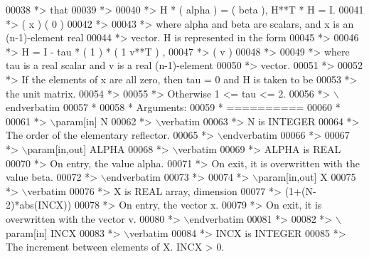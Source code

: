 \begin{DoxyCode}
00038 \textcolor{comment}{*> that}
00039 \textcolor{comment}{*>}
00040 \textcolor{comment}{*>       H * ( alpha ) = ( beta ),   H**T * H = I.}
00041 \textcolor{comment}{*>           (   x   )   (   0  )}
00042 \textcolor{comment}{*>}
00043 \textcolor{comment}{*> where alpha and beta are scalars, and x is an (n-1)-element real}
00044 \textcolor{comment}{*> vector. H is represented in the form}
00045 \textcolor{comment}{*>}
00046 \textcolor{comment}{*>       H = I - tau * ( 1 ) * ( 1 v**T ) ,}
00047 \textcolor{comment}{*>                     ( v )}
00048 \textcolor{comment}{*>}
00049 \textcolor{comment}{*> where tau is a real scalar and v is a real (n-1)-element}
00050 \textcolor{comment}{*> vector.}
00051 \textcolor{comment}{*>}
00052 \textcolor{comment}{*> If the elements of x are all zero, then tau = 0 and H is taken to be}
00053 \textcolor{comment}{*> the unit matrix.}
00054 \textcolor{comment}{*>}
00055 \textcolor{comment}{*> Otherwise  1 <= tau <= 2.}
00056 \textcolor{comment}{*> \(\backslash\)endverbatim}
00057 \textcolor{comment}{*}
00058 \textcolor{comment}{*  Arguments:}
00059 \textcolor{comment}{*  ==========}
00060 \textcolor{comment}{*}
00061 \textcolor{comment}{*> \(\backslash\)param[in] N}
00062 \textcolor{comment}{*> \(\backslash\)verbatim}
00063 \textcolor{comment}{*>          N is INTEGER}
00064 \textcolor{comment}{*>          The order of the elementary reflector.}
00065 \textcolor{comment}{*> \(\backslash\)endverbatim}
00066 \textcolor{comment}{*>}
00067 \textcolor{comment}{*> \(\backslash\)param[in,out] ALPHA}
00068 \textcolor{comment}{*> \(\backslash\)verbatim}
00069 \textcolor{comment}{*>          ALPHA is REAL}
00070 \textcolor{comment}{*>          On entry, the value alpha.}
00071 \textcolor{comment}{*>          On exit, it is overwritten with the value beta.}
00072 \textcolor{comment}{*> \(\backslash\)endverbatim}
00073 \textcolor{comment}{*>}
00074 \textcolor{comment}{*> \(\backslash\)param[in,out] X}
00075 \textcolor{comment}{*> \(\backslash\)verbatim}
00076 \textcolor{comment}{*>          X is REAL array, dimension}
00077 \textcolor{comment}{*>                         (1+(N-2)*abs(INCX))}
00078 \textcolor{comment}{*>          On entry, the vector x.}
00079 \textcolor{comment}{*>          On exit, it is overwritten with the vector v.}
00080 \textcolor{comment}{*> \(\backslash\)endverbatim}
00081 \textcolor{comment}{*>}
00082 \textcolor{comment}{*> \(\backslash\)param[in] INCX}
00083 \textcolor{comment}{*> \(\backslash\)verbatim}
00084 \textcolor{comment}{*>          INCX is INTEGER}
00085 \textcolor{comment}{*>          The increment between elements of X. INCX > 0.}

\end{DoxyCode}
